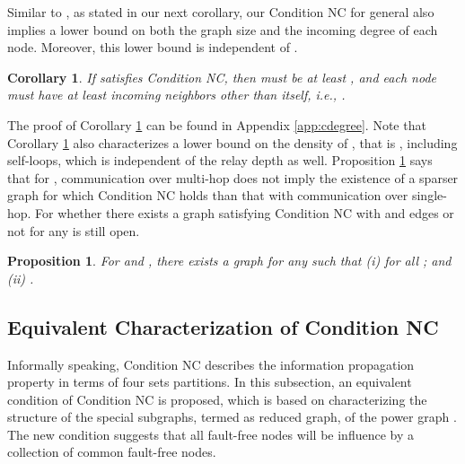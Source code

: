 \documentclass[letterpaper, 11pt]{article}
\newtheorem{proposition}[theorem]{Proposition}
\newtheorem{corollary}[theorem]{Corollary}
\begin{document}
Similar to \cite{Vaidya2012IABC}, as stated in our next corollary, our Condition NC for general  also implies a lower bound on both the graph size  and the incoming degree of each node. Moreover, this lower bound is independent of .
\begin{corollary}
\label{cdegree}
If  satisfies Condition NC, then
  must be at least , and each node must have at least  incoming neighbors other than itself, i.e., .
\end{corollary}
The proof of Corollary \ref{cdegree} can be found in Appendix \ref{app:cdegree}. Note that Corollary \ref{cdegree} also characterizes a lower bound on the density of , that is , including self-loops, which is independent of the relay depth  as well. Proposition \ref{density} says that for , communication over multi-hop does not imply the existence of a sparser graph for which Condition NC holds than that with communication over single-hop. For  whether there exists a graph satisfying Condition NC with  and  edges or not for any  is still open.


\begin{proposition}
\label{density}
For  and , there exists a graph  for any  such that
(i)  for all ; and
(ii) .
\end{proposition}






\subsection{Equivalent Characterization of Condition NC}
Informally speaking, Condition NC describes the information propagation property in terms of four sets partitions. In this subsection, an equivalent condition of Condition NC is proposed, which is based on characterizing the structure of the special subgraphs, termed as reduced graph, of the power graph . The new condition suggests that all fault-free nodes will be influence by a collection of common fault-free nodes.
\end{document}
